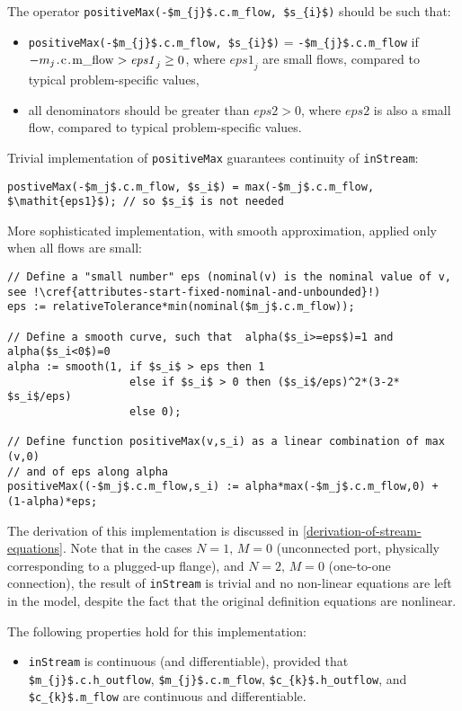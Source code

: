 \begin{nonnormative}
The operator
\lstinline!positiveMax(-$m_{j}$.c.m_flow, $s_{i}$)!
should be such that:
\begin{itemize}
\item
  \lstinline!positiveMax(-$m_{j}$.c.m_flow, $s_{i}$)! =
  \lstinline!-$m_{j}$.c.m_flow! if
  $-m_{j}\text{\lstinline!.c.m_flow!} > \mathit{eps1}_{j} \geq 0$,
  where $\mathit{eps1}_{j}$ are small flows, compared to typical
  problem-specific values,
\item
  all denominators should be greater than $\mathit{eps2} > 0$,
  where $\mathit{eps2}$ is also a small flow, compared to typical problem-specific
  values.
\end{itemize}

Trivial implementation of \lstinline!positiveMax! guarantees continuity of \lstinline!inStream!:
\begin{lstlisting}[language=modelica]
postiveMax(-$m_j$.c.m_flow, $s_i$) = max(-$m_j$.c.m_flow, $\mathit{eps1}$); // so $s_i$ is not needed
\end{lstlisting}
More sophisticated implementation, with smooth approximation, applied only when {all} flows are small:
\begin{lstlisting}[language=modelica,escapechar=!]
// Define a "small number" eps (nominal(v) is the nominal value of v, see !\cref{attributes-start-fixed-nominal-and-unbounded}!)
eps := relativeTolerance*min(nominal($m_j$.c.m_flow));

// Define a smooth curve, such that  alpha($s_i>=eps$)=1 and alpha($s_i<0$)=0
alpha := smooth(1, if $s_i$ > eps then 1
                   else if $s_i$ > 0 then ($s_i$/eps)^2*(3-2* $s_i$/eps)
                   else 0);

// Define function positiveMax(v,s_i) as a linear combination of max (v,0)
// and of eps along alpha
positiveMax((-$m_j$.c.m_flow,s_i) := alpha*max(-$m_j$.c.m_flow,0) + (1-alpha)*eps;
\end{lstlisting}

The derivation of this implementation is discussed in
\cref{derivation-of-stream-equations}. Note that in the cases $N = 1,\, M = 0$ (unconnected port,
physically corresponding to a plugged-up flange), and $N = 2,\,  M = 0$
(one-to-one connection), the result of \lstinline!inStream! is trivial
and no non-linear equations are left in the model, despite the fact that
the original definition equations are nonlinear.

The following properties hold for this implementation:
\begin{itemize}
\item
  \lstinline!inStream! is continuous (and differentiable),
  provided that \lstinline!$m_{j}$.c.h_outflow!,
  \lstinline!$m_{j}$.c.m_flow!, \lstinline!$c_{k}$.h_outflow!, and
  \lstinline!$c_{k}$.m_flow! are continuous and differentiable.
\end{itemize}


\end{nonnormative}
